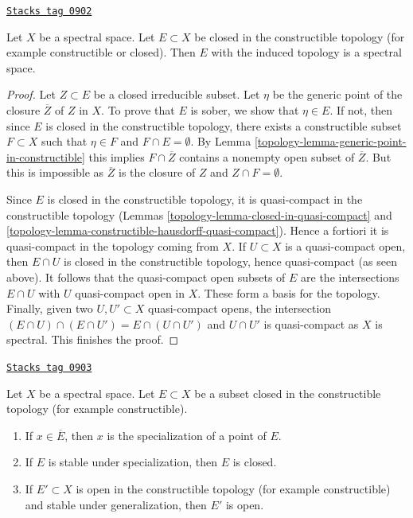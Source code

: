 \begin{lemma}
\label{topology-lemma-spectral-sub}
\href{https://stacks.math.columbia.edu/tag/0902}{\texttt{Stacks tag 0902}}

Let $X$ be a spectral space. Let $E \subset X$ be closed in the constructible
topology (for example constructible or closed). Then $E$ with the induced
topology is a spectral space.
\end{lemma}

\begin{proof}

Let $Z \subset E$ be a closed irreducible subset. Let $\eta$ be the generic
point of the closure $\overline{Z}$ of $Z$ in $X$. To prove that $E$
is sober, we show that $\eta \in E$. If not, then since $E$ is closed
in the constructible topology, there exists a constructible subset
$F \subset X$ such that $\eta \in F$ and $F \cap E = \emptyset$.
By Lemma \ref{topology-lemma-generic-point-in-constructible} this implies
$F \cap \overline{Z}$ contains a nonempty open subset of $\overline{Z}$.
But this is impossible as $\overline{Z}$ is the closure of $Z$ and
$Z \cap F = \emptyset$.

\medskip\noindent
Since $E$ is closed in the constructible topology, it is quasi-compact
in the constructible topology
(Lemmas \ref{topology-lemma-closed-in-quasi-compact} and
\ref{topology-lemma-constructible-hausdorff-quasi-compact}). Hence a fortiori it is
quasi-compact in the topology coming from $X$. If $U \subset X$
is a quasi-compact open, then $E \cap U$ is closed in the constructible
topology, hence quasi-compact (as seen above). It follows that the
quasi-compact open subsets of $E$ are the intersections $E \cap U$
with $U$ quasi-compact open in $X$. These form a basis for the topology.
Finally, given two $U, U' \subset X$ quasi-compact opens, the intersection
$(E \cap U) \cap (E \cap U') = E \cap (U \cap U')$ and $U \cap U'$
is quasi-compact as $X$ is spectral. This finishes the proof.
\end{proof}

\begin{lemma}
\label{topology-lemma-constructible-stable-specialization-closed}
\href{https://stacks.math.columbia.edu/tag/0903}{\texttt{Stacks tag 0903}}

Let $X$ be a spectral space. Let $E \subset X$ be a subset closed
in the constructible topology (for example constructible).
\begin{enumerate}
\item If $x \in \overline{E}$, then $x$ is the specialization of a point of
$E$.
\item If $E$ is stable under specialization, then $E$ is closed.
\item If $E' \subset X$ is open in the constructible topology
(for example constructible) and stable under generalization, then $E'$ is open.
\end{enumerate}
\end{lemma}


